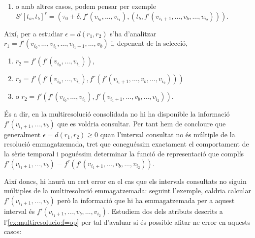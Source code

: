 \begin{itemize}
\begin{enumerate}
  \item o amb altres casos, podem pensar per exemple
    $S'[t_a,t_b]^r=(\tau_0+\delta, f'(v_{i_0},\dotsc,v_{i_1}), (t_b,
    f'(v_{i_1+1},\dotsc,v_{b} ,\dotsc,v_{i_2})) )$.
   \end{enumerate}



  Així, per a estudiar $\epsilon=d(r_1,r_2)$ s'ha d'analitzar
  $r_1=f'(v_{i_0},\dotsc,v_{i_1},\dotsc, v_{i_1+1},\dotsc,v_{b})$ i,
  depenent de la selecció,
   \begin{enumerate}
   \item $r_2=f'(f'(v_{i_0},\dotsc,v_{i_1}))$, 

   \item
     $r_2=f'(f'(v_{i_0},\dotsc,v_{i_1}),f^r(f'(v_{i_1+1},\dotsc,v_{b},\dotsc,v_{i_2})))$
     \item o $r_2=f'(f'(v_{i_0},\dotsc,v_{i_1}),f'(v_{i_1+1},\dotsc,v_{b},\dotsc,v_{i_2}))$.
\end{enumerate}

  És a dir, en la multiresolució consolidada no hi ha disponible la
  informació $f'(v_{i_1+1},\dotsc,v_{b})$ que es voldria consultar.
  Per tant hem de concloure que generalment $\epsilon=d(r_1,r_2)\geq
  0$ quan l'interval consultat no és múltiple de la resolució
  emmagatzemada, tret que coneguéssim exactament el comportament de la
  sèrie temporal i poguéssim determinar la funció de representació que complís 
  $ f'(v_{i_1+1},\dotsc,v_{b}) = f^r(f'(v_{i_1+1},\dotsc,v_{b},\dotsc,v_{i_2}))$.
\end{itemize}


Així doncs, hi haurà un cert error en el cas que els intervals
consultats no siguin múltiples de la multiresolució emmagatzemada:
seguint l'exemple, caldria calcular $f'(v_{i_1+1},\dotsc,v_{b})$ però
la informació que hi ha emmagatzemada per a aquest interval és
$f'(v_{i_1+1},\dotsc,v_{b},\dotsc,v_{i_2})$. Estudiem dos dels
atributs descrits a l'\autoref{ex:multiresolucio:f=op} per tal
d'avaluar si és possible afitar-ne error en aquests casos:


